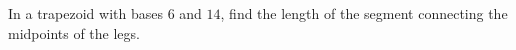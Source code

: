 In a trapezoid with bases $6$ and $14$, find the length of the segment connecting the midpoints of the legs.
